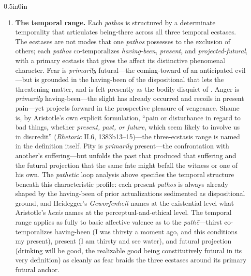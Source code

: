 \begin{adjustwidth}{0.5in}{0in}
\begin{enumerate}
        \item \textbf{The temporal range.} Each \textit{pathos} is structured by a determinate temporality that articulates being-there across all three temporal ecstases. The ecstases are not modes that one \textit{pathos} possesses to the exclusion of others; each \textit{pathos} co-temporalizes \textit{having-been}, \textit{present}, and \textit{projected-futural}, with a primary ecstasis that gives the affect its distinctive phenomenal character. Fear is \textit{primarily} futural---the coming-toward of an anticipated evil---but is grounded in the having-been of the dispositional  that lets the threatening matter, and is felt presently as the bodily disquiet of . Anger is \textit{primarily} having-been---the slight has already occurred and recoils in present pain---yet projects forward in the prospective pleasure of vengeance. Shame is, by Aristotle's own explicit formulation, ``pain or disturbance in regard to bad things, whether \textit{present, past, or future}, which seem likely to involve us in discredit'' (\textit{Rhetoric} II.6, 1383b13--15)---the three-ecstasis range is named in the definition itself. Pity is \textit{primarily} present---the confrontation with another's suffering---but unfolds the past that produced that suffering and the futural projection that the same fate might befall the witness or one of his own. The \textit{pathetic} loop analysis above specifies the temporal structure beneath this characteristic profile: each present \textit{pathos} is always already shaped by the having-been of prior actualizations sedimented as dispositional ground, and Heidegger's \textit{Geworfenheit} names at the existential level what Aristotle's \textit{hexis} names at the perceptual-and-ethical level. The temporal range applies as fully to basic affective valence as to the \textit{pathē}---thirst co-temporalizes having-been (I was thirsty a moment ago, and this conditions my present), present (I am thirsty and see water), and futural projection (drinking will be good, the realizable good being constitutively futural in its very definition) as cleanly as fear braids the three ecstases around its primary futural anchor. 
        

\end{enumerate}
\end{adjustwidth}
